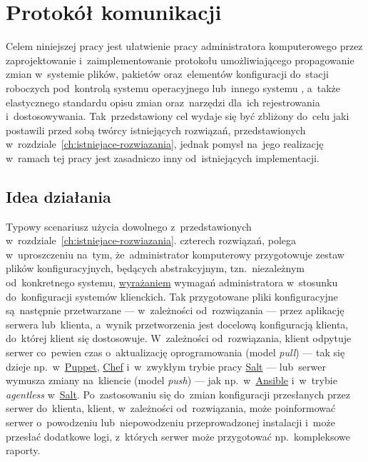 \documentclass[thesis]{subfiles}
\begin{document}
\chapter{Protokół komunikacji}
\label{ch:protokol}

Celem niniejszej pracy jest ułatwienie pracy administratora komputerowego przez zaprojektowanie i~zaimplementowanie protokołu umożliwiającego propagowanie zmian w~systemie plików, pakietów oraz~elementów konfiguracji do~stacji roboczych pod~kontrolą systemu operacyjnego  lub~innego systemu , a~także elastycznego standardu opisu zmian oraz~narzędzi dla~ich rejestrowania i~dostosowywania. Tak~przedstawiony cel wydaje się być zbliżony do~celu jaki postawili przed sobą twórcy istniejących rozwiązań, przedstawionych w~rozdziale~\ref{ch:istniejace-rozwiazania}, jednak pomysł na~jego realizację w~ramach tej pracy jest zasadniczo inny od~istniejących implementacji.


\section{Idea działania}

Typowy scenariusz użycia dowolnego z~przedstawionych w~rozdziale~\ref{ch:istniejace-rozwiazania}. czterech rozwiązań, polega w~uproszczeniu na~tym, że~administrator komputerowy przygotowuje zestaw plików konfiguracyjnych, będących abstrakcyjnym, tzn.~niezależnym od~konkretnego systemu, \href{https://martinfowler.com/bliki/DomainSpecificLanguage.html}{wyrażaniem} wymagań administratora w~stosunku do~konfiguracji systemów klienckich. Tak przygotowane pliki konfiguracyjne są~następnie przetwarzane --- w~zależności od~rozwiązania --- przez aplikację serwera lub~klienta, a~wynik przetworzenia jest docelową konfiguracją klienta, do~której klient się dostosowuje. W~zależności od~rozwiązania, klient odpytuje serwer co~pewien czas o~aktualizację oprogramowania (model \emph{pull}) --- tak się dzieje np.~w~\hyperref[sec:puppet]{Puppet}, \hyperref[sec:chef]{Chef} i~w~zwykłym trybie pracy \hyperref[sec:salt]{Salt} --- lub~serwer wymusza zmiany na~kliencie (model \emph{push}) --- jak np.~w~\hyperref[sec:ansible]{Ansible} i~w~trybie \emph{agentless} w~\hyperref[sec:salt]{Salt}. Po~zastosowaniu się do~zmian konfiguracji przesłanych przez serwer do~klienta, klient, w~zależności od~rozwiązania, może poinformować serwer o~powodzeniu lub~niepowodzeniu przeprowadzonej instalacji i~może przesłać dodatkowe logi, z~których serwer może przygotować np.~kompleksowe raporty.
\end{document}
